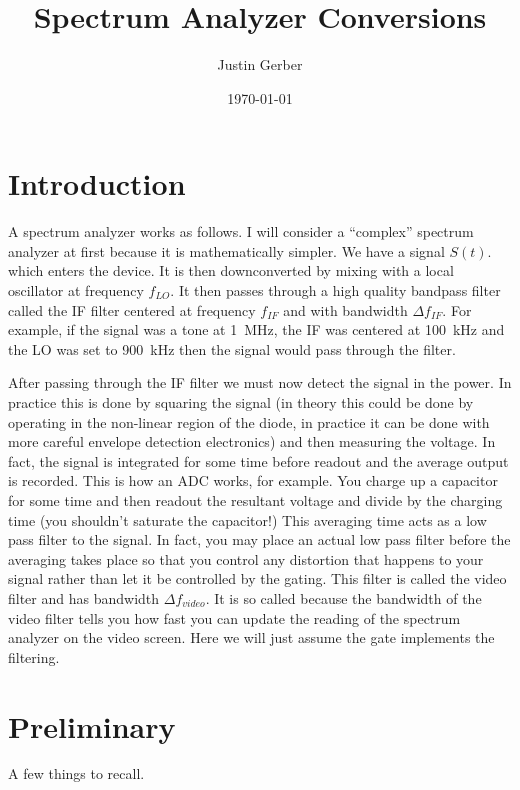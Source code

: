 \documentclass[12pt]{article}
\begin{document}
\title{Spectrum Analyzer Conversions}
\author{Justin Gerber}
\date{\today}
\maketitle

\section{Introduction}

A spectrum analyzer works as follows. 
I will consider a ``complex'' spectrum analyzer at first because it is mathematically simpler. We have a signal $S(t)$. 
which enters the device. 
It is then downconverted by mixing with a local oscillator at frequency $f_{LO}$. 
It then passes through a high quality bandpass filter called the IF filter centered at frequency $f_{IF}$ and with bandwidth $\Delta f_{IF}$. 
For example, if the signal was a tone at \SI{1}{\MHz}, the IF was centered at \SI{100}{\kHz} and the LO was set to \SI{900}{\kHz} then the signal would pass through the filter.

After passing through the IF filter we must now detect the signal in the power. In practice this is done by squaring the signal (in theory this could be done by operating in the non-linear region of the diode, in practice it can be done with more careful envelope detection electronics) and then measuring the voltage.
In fact, the signal is integrated for some time before readout and the average output is recorded.
This is how an ADC works, for example.
You charge up a capacitor for some time and then readout the resultant voltage and divide by the charging time (you shouldn't saturate the capacitor!)
This averaging time acts as a low pass filter to the signal.
In fact, you may place an actual low pass filter before the averaging takes place so that you control any distortion that happens to your signal rather than let it be controlled by the gating.
This filter is called the video filter and has bandwidth $\Delta f_{video}$.
It is so called because the bandwidth of the video filter tells you how fast you can update the reading of the spectrum analyzer on the video screen.
Here we will just assume the gate implements the filtering.

\section{Preliminary}

A few things to recall.
\end{document}
